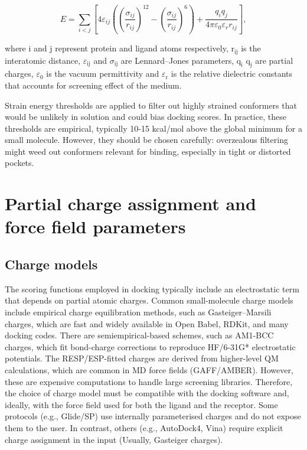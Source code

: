\documentclass[12pt]{article}
\begin{document}
\begin{equation}
E = \sum_{i<j} \left[ 4 \varepsilon_{ij} \left( \left( \frac{\sigma_{ij}}{r_{ij}} \right)^{12} - \left( \frac{\sigma_{ij}}{r_{ij}} \right)^{6} \right) + \frac{q_i q_j}{4 \pi \varepsilon_0 \varepsilon_r r_{ij}} \right],
\end{equation}

where i and j represent protein and ligand atoms respectively, $\textrm{r}_\textrm{ij}$ is the interatomic distance, $\varepsilon_\textrm{ij}$ and $\sigma_\textrm{ij}$ are Lennard--Jones parameters, $\textrm{q}_\textrm{i}$ $\textrm{q}_\textrm{j}$ are partial charges, $\varepsilon_\textrm{0}$ is the vacuum permittivity and $\varepsilon_\textrm{r}$ is the relative dielectric constants that accounts for screening effect of the medium.

Strain energy thresholds are applied to filter out highly strained conformers that would be unlikely in solution and could bias docking scores. In practice, these thresholds are empirical, typically 10-15 kcal/mol above the global minimum for a small molecule. However, they should be chosen carefully: overzealous filtering might weed out conformers relevant for binding, especially in tight or distorted pockets.

\section{Partial charge assignment and force field parameters}

\subsection{Charge models}

 The scoring functions employed in docking typically include an electrostatic term that depends on partial atomic charges. Common small-molecule charge models include empirical charge equilibration methods, such as Gasteiger–Marsili charges\cite{CH6_gasteiger1978new}, which are fast and widely available in Open Babel, RDKit, and many docking codes. There are semiempirical-based schemes, such as AM1-BCC charges\cite{CH6_jakalian2000fast}, which fit bond-charge corrections to reproduce HF/6-31G* electrostatic potentials. The RESP/ESP-fitted charges\cite{CH6_bayly1993well} are derived from higher-level QM calculations, which are common in MD force fields (GAFF/AMBER). However, these are expensive computations to handle large screening libraries. Therefore, the choice of charge model must be compatible with the docking software and, ideally, with the force field used for both the ligand and the receptor. Some protocols (e.g., Glide/SP) use internally parameterised charges and do not expose them to the user. In contrast, others (e.g., AutoDock4, Vina) require explicit charge assignment in the input (Usually, Gasteiger charges\cite{CH6_gasteiger1980iterative}).
\end{document}
